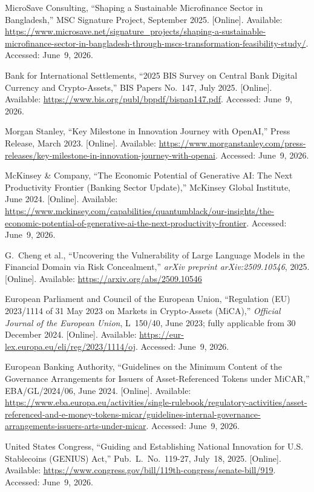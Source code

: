 \documentclass[12pt,a4paper]{report}
\begin{document}
{\begin{enumerate}[label={[\arabic*]}]
\item MicroSave Consulting, ``Shaping a Sustainable Microfinance Sector in Bangladesh,'' MSC Signature Project, September 2025. [Online]. Available: \url{https://www.microsave.net/signature_projects/shaping-a-sustainable-microfinance-sector-in-bangladesh-through-mscs-transformation-feasibility-study/}. Accessed: June~9, 2026.
\item Bank for International Settlements, ``2025 BIS Survey on Central Bank Digital Currency and Crypto-Assets,'' BIS Papers No.~147, July 2025. [Online]. Available: \url{https://www.bis.org/publ/bppdf/bispap147.pdf}. Accessed: June~9, 2026.

\item Morgan Stanley, ``Key Milestone in Innovation Journey with OpenAI,'' Press Release, March 2023. [Online]. Available: \url{https://www.morganstanley.com/press-releases/key-milestone-in-innovation-journey-with-openai}. Accessed: June~9, 2026.
\item McKinsey \& Company, ``The Economic Potential of Generative AI: The Next Productivity Frontier (Banking Sector Update),'' McKinsey Global Institute, June 2024. [Online]. Available: \url{https://www.mckinsey.com/capabilities/quantumblack/our-insights/the-economic-potential-of-generative-ai-the-next-productivity-frontier}. Accessed: June~9, 2026.

\item G.~Cheng et al., ``Uncovering the Vulnerability of Large Language Models in the Financial Domain via Risk Concealment,'' \textit{arXiv preprint arXiv:2509.10546}, 2025. [Online]. Available: \url{https://arxiv.org/abs/2509.10546}
\item European Parliament and Council of the European Union, ``Regulation (EU) 2023/1114 of 31 May 2023 on Markets in Crypto-Assets (MiCA),'' \textit{Official Journal of the European Union}, L~150/40, June 2023; fully applicable from 30 December 2024. [Online]. Available: \url{https://eur-lex.europa.eu/eli/reg/2023/1114/oj}. Accessed: June~9, 2026.

\item European Banking Authority, ``Guidelines on the Minimum Content of the Governance Arrangements for Issuers of Asset-Referenced Tokens under MiCAR,'' EBA/GL/2024/06, June 2024. [Online]. Available: \url{https://www.eba.europa.eu/activities/single-rulebook/regulatory-activities/asset-referenced-and-e-money-tokens-micar/guidelines-internal-governance-arrangements-issuers-arts-under-micar}. Accessed: June~9, 2026.
\item United States Congress, ``Guiding and Establishing National Innovation for U.S. Stablecoins (GENIUS) Act,'' Pub.~L.~No.~119-27, July~18, 2025. [Online]. Available: \url{https://www.congress.gov/bill/119th-congress/senate-bill/919}. Accessed: June~9, 2026.


\end{enumerate}}
\end{document}
